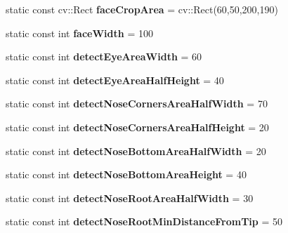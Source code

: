 \begin{DoxyCompactItemize}
\item 
\hypertarget{class_common_ac8744938a8eafb989172de2d2a3dcd6b}{static const cv\+::\+Rect {\bfseries face\+Crop\+Area} = cv\+::\+Rect(60,50,200,190)}\label{class_common_ac8744938a8eafb989172de2d2a3dcd6b}

\item 
\hypertarget{class_common_a95755eed531e0e36bfafd1a7414d4bba}{static const int {\bfseries face\+Width} = 100}\label{class_common_a95755eed531e0e36bfafd1a7414d4bba}

\item 
\hypertarget{class_common_affaf2808228e266e52ccda820ca9c2d6}{static const int {\bfseries detect\+Eye\+Area\+Width} = 60}\label{class_common_affaf2808228e266e52ccda820ca9c2d6}

\item 
\hypertarget{class_common_aa60e2893d0aa698c80df6e963351261c}{static const int {\bfseries detect\+Eye\+Area\+Half\+Height} = 40}\label{class_common_aa60e2893d0aa698c80df6e963351261c}

\item 
\hypertarget{class_common_a2ff6f7733812ed4ea6b33a83d05fc65b}{static const int {\bfseries detect\+Nose\+Corners\+Area\+Half\+Width} = 70}\label{class_common_a2ff6f7733812ed4ea6b33a83d05fc65b}

\item 
\hypertarget{class_common_ae1fae889f579ddc08e82687249821159}{static const int {\bfseries detect\+Nose\+Corners\+Area\+Half\+Height} = 20}\label{class_common_ae1fae889f579ddc08e82687249821159}

\item 
\hypertarget{class_common_a56738db887f97b1fc5208047da5a1ec0}{static const int {\bfseries detect\+Nose\+Bottom\+Area\+Half\+Width} = 20}\label{class_common_a56738db887f97b1fc5208047da5a1ec0}

\item 
\hypertarget{class_common_a79fbca043edea7b7733f6b99f65a0a40}{static const int {\bfseries detect\+Nose\+Bottom\+Area\+Height} = 40}\label{class_common_a79fbca043edea7b7733f6b99f65a0a40}

\item 
\hypertarget{class_common_a7c9c0ba994f8b3fed1d06a43844e89df}{static const int {\bfseries detect\+Nose\+Root\+Area\+Half\+Width} = 30}\label{class_common_a7c9c0ba994f8b3fed1d06a43844e89df}

\item 
\hypertarget{class_common_a2f4780951ddc0024d81308ddb6c86005}{static const int {\bfseries detect\+Nose\+Root\+Min\+Distance\+From\+Tip} = 50}\label{class_common_a2f4780951ddc0024d81308ddb6c86005}


\end{DoxyCompactItemize}

